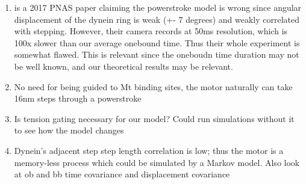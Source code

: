 \documentclass[9pt,twocolumn,twoside]{pnas-new}
\begin{document}
\begin{enumerate}
\item \cite{lippert} is a 2017 PNAS paper claiming the powerstroke model is wrong since angular displacement of the dynein ring is weak (+- 7 degrees) and weakly correlated with stepping. However, their camera records at 50ms resolution, which is 100x slower than our average onebound time. Thus their whole experiment is somewhat flawed. This is relevant since the oneboudn time duration may not be well known, and our theoretical results may be relevant.
\item No need for being guided to Mt binding sites, the motor naturally can take 16nm steps through a powerstroke
\item Is tension gating necessary for our model? Could run simulations without it to see how the model changes
\item Dynein's adjacent step step length correlation is low; thus the motor is a memory-less process which could be simulated by a Markov model. Also look at ob and bb time covariance and displacement covariance
\end{enumerate}



\end{document}
